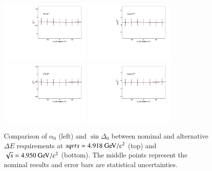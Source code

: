 \begin{figure}[h]\centering
    \includegraphics[width=0.40\textwidth]{figure/isr_effects/pwa_fit/output_resutls_deltaE_alpha_4914.pdf}
    \includegraphics[width=0.40\textwidth]{figure/isr_effects/pwa_fit/output_resutls_deltaE_delta_4914.pdf} \\
    \includegraphics[width=0.40\textwidth]{figure/isr_effects/pwa_fit/output_resutls_deltaE_alpha_4946.pdf}
    \includegraphics[width=0.40\textwidth]{figure/isr_effects/pwa_fit/output_resutls_deltaE_delta_4946.pdf}
    \caption{Comparison of $\alpha_0$ (left) and $\sin\Delta_0$ between nominal and alternative $\Delta E$ requirements at $sqrt{s} = 4.918\gev/c^2$ (top) and $\sqrt{s} = 4.950\gev/c^2$ (bottom). The middle points represent the nominal results and error bars are statistical uncertainties.}
\label{fig:comparison_deltaE}
\end{figure}

